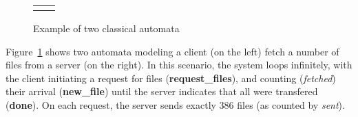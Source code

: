 \begin{figure}[hbt!]
   \centering
   \begin{tabular}{cc}
    &
   
   \end{tabular}
   \caption{Example of two classical automata}
   \label{fr:fig:classical_automata}
\end{figure}

\begin{example}
\label{fr:ex:classical_automata}
Figure~\ref{fr:fig:classical_automata} shows two automata modeling a client (on
the left) fetch a number of files from a server (on the right).  In this
scenario, the system loops infinitely, with the client initiating a request for
files (\textbf{request\_files}), and counting (\textit{fetched}) their arrival
(\textbf{new\_file}) until the server indicates that all were transfered
(\textbf{done}). On each request, the server sends exactly 386 files (as
counted by \textit{sent}).
\end{example}

